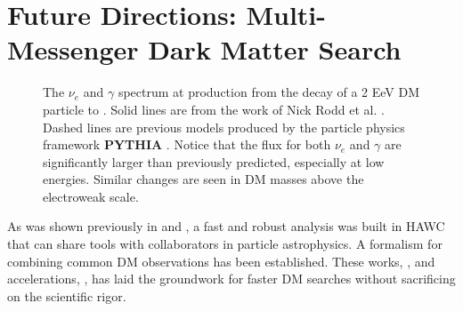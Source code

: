 \section{Future Directions: Multi-Messenger Dark Matter Search}\label{sec:future}

\begin{figure}[h]
    \caption{The $\nu_e$ and $\gamma$ spectrum at production from the decay of a 2 EeV DM particle to . Solid lines are from the work of Nick Rodd et al. \cite{Rodd:HDM_spec}. Dashed lines are previous models produced by the particle physics framework \textbf{PYTHIA} \cite{PYTHIA}. Notice that the flux for both $\nu_e$ and $\gamma$ are significantly larger than previously predicted, especially at low energies. Similar changes are seen in DM masses above the electroweak scale.}
    \label{fig:nu_and_gam}
\end{figure}

As was shown previously in  and , a fast and robust analysis was built in HAWC that can share tools with collaborators in particle astrophysics.
A formalism for combining common DM observations has been established.
These works, , and accelerations, , has laid the groundwork for faster DM searches without sacrificing on the scientific rigor.

